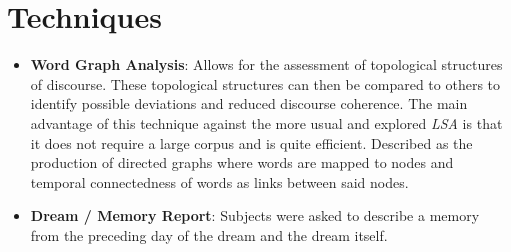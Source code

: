 \documentclass{Paper_Summary}
\begin{document}
\section{Techniques}
    \begin{itemize}
        \item \textbf{Word Graph Analysis}: Allows for the assessment of topological structures of discourse. These topological structures can then be compared to others to identify possible deviations and reduced discourse coherence. The main advantage of this technique against the more usual and explored \emph{LSA} is that it does not require a large corpus and is quite efficient. Described as the production of directed graphs where words are mapped to nodes and temporal connectedness of words as links between said nodes.
        \item \textbf{Dream / Memory Report}: Subjects were asked to describe a memory from the preceding day of the dream and the dream itself.
    \end{itemize}
\end{document}

